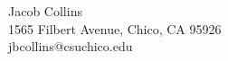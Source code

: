 \documentclass[twocolumn]{cinc}
\begin{document}

  
  
      


\begin{correspondence}
Jacob Collins\\
1565 Filbert Avenue, Chico, CA 95926\\
jbcollins@csuchico.edu
\end{correspondence}
\end{document}
